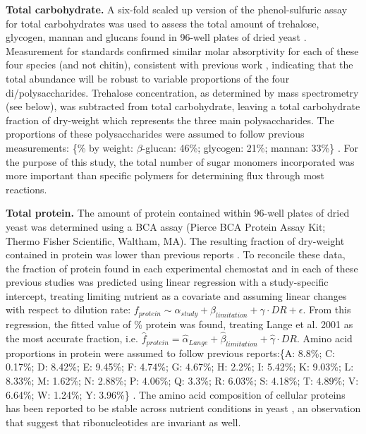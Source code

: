 \documentclass[12pt]{nature}\usepackage{graphicx, color}
\begin{document}
\textbf{Total carbohydrate.} A six-fold scaled up version of the phenol-sulfuric assay for total carbohydrates was used to assess the total amount of trehalose, glycogen, mannan and glucans found in 96-well plates of dried yeast \cite{Masuko:2005fy}.  Measurement for standards confirmed similar molar absorptivity for each of these four species (and not chitin), consistent with previous work \cite{Masuko:2005fy}, indicating that the total abundance will be robust to variable proportions of the four di/polysaccharides.  Trehalose concentration, as determined by mass spectrometry (see below), was subtracted from total carbohydrate, leaving a total carbohydrate fraction of dry-weight which represents the three main polysaccharides.  The proportions of these polysaccharides were assumed to follow previous measurements: \{\% by weight: $\beta$-glucan: 46\%; glycogen: 21\%; mannan: 33\%\} \cite{Herrgard:2008gb}.  For the purpose of this study, the total number of sugar monomers incorporated was more important than specific polymers for determining flux through most reactions.  

\textbf{Total protein.} The amount of protein contained within 96-well plates of dried yeast was determined using a BCA assay (Pierce BCA Protein Assay Kit; Thermo Fisher Scientific, Waltham, MA). The resulting fraction of dry-weight contained in protein was lower than previous reports \cite{main-Schulze:1995uv, main-Lange:2001th}.  To reconcile these data, the fraction of protein found in each experimental chemostat and in each of these previous studies was predicted using linear regression with a study-specific intercept, treating limiting nutrient as a covariate and assuming linear changes with respect to dilution rate: $f_{protein} \sim \alpha_{study} + \beta_{limitation} + \gamma \cdot DR + \epsilon$.  From this regression, the fitted value of \% protein was found, treating Lange et al. 2001 as the most accurate fraction, i.e. $\hat{f}_{protein} = \hat{\alpha}_{Lange} + \hat{\beta}_{limitation} + \hat{\gamma} \cdot DR$.  Amino acid proportions in protein were assumed to follow previous reports:\{A: 8.8\%; C: 0.17\%; D: 8.42\%; E: 9.45\%; F: 4.74\%; G: 4.67\%; H: 2.2\%; I: 5.42\%; K: 9.03\%; L: 8.33\%; M: 1.62\%; N: 2.88\%; P: 4.06\%; Q: 3.3\%; R: 6.03\%; S: 4.18\%; T: 4.89\%; V: 6.64\%; W: 1.24\%; Y: 3.96\%\} \cite{Herrgard:2008gb}.  The amino acid composition of cellular proteins has been reported to be stable across nutrient conditions in yeast \cite{Lange:2001th}, an observation that suggest that ribonucleotides are invariant as well.
\end{document}
